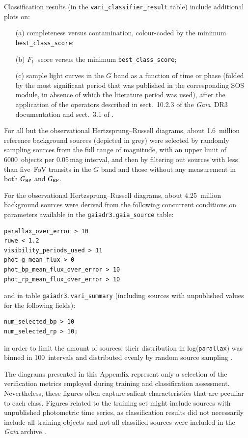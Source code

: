 \documentclass[longauth]{aa}
\def\gaia{\textit{Gaia}\xspace}
\def\gdr3{\textit{Gaia}~DR3\xspace}
\def\g{$G$\xspace}
\def\bp{$G_{\rm BP}$\xspace}
\def\rp{$G_{\rm RP}$\xspace}
\begin{document}
\begin{appendix}
Classification results (in the \texttt{vari\_classifier\_result} table) include additional plots on:
 \begin{itemize}
\item[(a)] completeness versus contamination, colour-coded by the minimum \texttt{best\_class\_score};
\item[(b)] $F_1$~score versus the minimum \texttt{best\_class\_score};
\item[(c)] sample light curves in the \g band as a function of time or phase (folded by the most significant period that was published in the corresponding SOS module, in absence of which the literature period was used), after the application of the operators described in sect.~10.2.3 of the \gdr3 documentation \citep{2022gdr3.reptE..10R} and sect.~3.1 of \citet{DR3-DPACP-162}.
\end{itemize}

For all but the observational Hertzsprung--Russell diagrams, about 1.6~million reference background sources (depicted in grey) were selected by randomly sampling sources from the full range of magnitude, with an upper limit of 6000~objects per 0.05\,mag interval, and then by filtering out sources with less than five~FoV transits in the \g band and those without any measurement in both \bp and \rp.

For the observational Hertzsprung--Russell diagrams, about 4.25~million background sources were derived from the following concurrent conditions on parameters available in the  \texttt{gaiadr3.gaia\_source} table:
\begin{verbatim}
parallax_over_error > 10
ruwe < 1.2
visibility_periods_used > 11
phot_g_mean_flux > 0
phot_bp_mean_flux_over_error > 10
phot_rp_mean_flux_over_error > 10
\end{verbatim}
and in table \texttt{gaiadr3.vari\_summary} (including sources with unpublished values for the following fields):
\begin{verbatim}
num_selected_bp > 10
num_selected_rp > 10;
\end{verbatim}
in order to limit the amount of sources, their distribution in log(\texttt{parallax}) was binned in 100~intervals and distributed evenly by random source sampling \citep[for more details, see][]{DR3-DPACP-177}.

The diagrams presented in this Appendix represent only a selection of the verification metrics employed during training and classification assessment. Nevertheless, these figures often capture salient characteristics that are peculiar to each class.
Figures related to the training set might include sources with unpublished photometric time series, as classification results did not necessarily include all training objects and not all classified sources were included in the \gaia archive \citep{DR3-CU9}.



\end{appendix}
\end{document}

